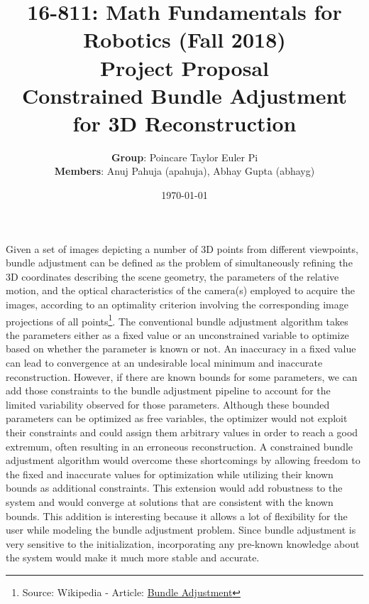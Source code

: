 \documentclass[letter, 12pt]{article}
\title{16-811: Math Fundamentals for Robotics (Fall 2018)\\ Project Proposal \\ \textbf{Constrained Bundle Adjustment for 3D Reconstruction}}
\author{\textbf{Group}: Poincare Taylor Euler Pi \\ \textbf{Members}: Anuj Pahuja (apahuja), Abhay Gupta (abhayg)}
\date{\today}
\begin{document}
\maketitle

Given a set of images depicting a number of 3D points from different viewpoints, bundle adjustment can be defined as the problem of simultaneously refining the 3D coordinates describing the scene geometry, the parameters of the relative motion, and the optical characteristics of the camera(s) employed to acquire the images, according to an optimality criterion involving the corresponding image projections of all points\footnote{Source: Wikipedia - Article: \href{https://en.wikipedia.org/wiki/Bundle\_adjustment}{Bundle Adjustment}}. The conventional bundle adjustment algorithm takes the parameters either as a fixed value or an unconstrained variable to optimize based on whether the parameter is known or not. An inaccuracy in a fixed value can lead to convergence at an undesirable local minimum and inaccurate reconstruction. However, if there are known bounds for some parameters, we can add those constraints to the bundle adjustment pipeline to account for the limited variability observed for those parameters. Although these bounded parameters can be optimized as free variables, the optimizer would not exploit their constraints and could assign them arbitrary values in order to reach a good extremum, often resulting in an erroneous reconstruction. A constrained bundle adjustment algorithm would overcome these shortcomings by allowing freedom to the fixed and inaccurate values for optimization while utilizing their known bounds as additional constraints. This extension would add robustness to the system and would converge at solutions that are consistent with the known bounds. This addition is interesting because it allows a lot of flexibility for the user while modeling the bundle adjustment problem. Since bundle adjustment is very sensitive to the initialization, incorporating any pre-known knowledge about the system would make it much more stable and accurate.
\end{document}
